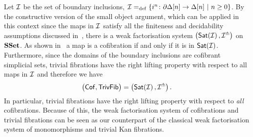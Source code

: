 \documentclass[reqno,10pt,a4paper,oneside,draft]{amsart}
\begin{document}
\begin{remark} Let $\cal{I}$ be the set of boundary inclusions, \ie $\cal{I} \defeq \{ i^n \co  \partial \Delta[n] \to \Delta[n] \ | \ n \geq 0 \}$.  By the constructive version of the small object argument, which can be applied in this context since the 
maps in $\cal{I}$ satisfy all the finiteness and decidability assumptions discussed  in~\cite[\S 4.1.4]{henry2018wms}, there is a weak factorisation system $\big( \mathsf{Sat}(\cal{I}) \, , \cal{I}^\pitchfork \big)$
on $\SSet$. As shown in~\cite[Proposition 5.1.7]{henry2018wms} a map is a cofibration if and only if it is in $\mathsf{Sat}(\cal{I})$. Furthermore, since the domains of the boundary inclusions are cofibrant simplicial sets, trivial fibrations have the right lifting property with respect to all maps in $\cal{I}$ and therefore we have
\[
\big( \Cof, \TrivFib \big) = \big( \mathsf{Sat}(\cal{I}) \, , \cal{I}^\pitchfork \big) \, .
\]
In particular, trivial fibrations have the right lifting property with respect to \emph{all} cofibrations. Because of this, the weak factorisation system of cofibrations and trivial fibrations can be seen as our counterpart of the classical weak factorisation system of monomorphisms and trivial Kan fibrations.
\end{remark} 
\end{document}
